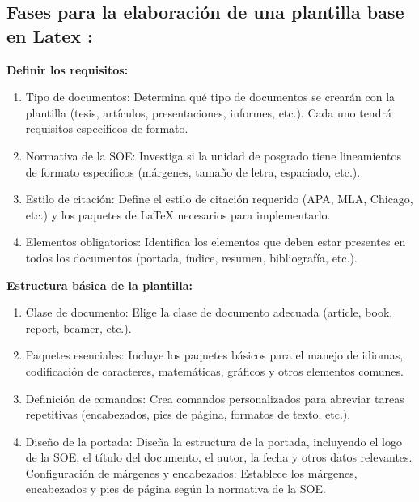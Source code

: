 \documentclass[12pt,twocolumn]{article}
\begin{document}
    \subsection{Fases para la elaboración de una plantilla base en Latex :}
    
{\raggedleft \textbf{Definir los requisitos:}}
    \begin{enumerate}
        \item Tipo de documentos: Determina qué tipo de documentos se crearán con la plantilla (tesis, artículos, presentaciones, informes, etc.). Cada uno tendrá requisitos específicos de formato.
        \item Normativa de la SOE: Investiga si la unidad de posgrado tiene lineamientos de formato específicos (márgenes, tamaño de letra, espaciado, etc.).
        \item Estilo de citación: Define el estilo de citación requerido (APA, MLA, Chicago, etc.) y los paquetes de LaTeX necesarios para implementarlo.
        \item Elementos obligatorios: Identifica los elementos que deben estar presentes en todos los documentos (portada, índice, resumen, bibliografía, etc.).
    \end{enumerate}
    
{\raggedleft \textbf{Estructura básica de la plantilla:}}
    \begin{enumerate}
        \item Clase de documento: Elige la clase de documento adecuada (article, book, report, beamer, etc.).
        \item Paquetes esenciales: Incluye los paquetes básicos para el manejo de idiomas, codificación de caracteres, matemáticas, gráficos y otros elementos comunes.
        \item Definición de comandos: Crea comandos personalizados para abreviar tareas repetitivas (encabezados, pies de página, formatos de texto, etc.).
        \item Diseño de la portada: Diseña la estructura de la portada, incluyendo el logo de la SOE, el título del documento, el autor, la fecha y otros datos relevantes.
    Configuración de márgenes y encabezados: Establece los márgenes, encabezados y pies de página según la normativa de la SOE.
    \end{enumerate}
\end{document}
